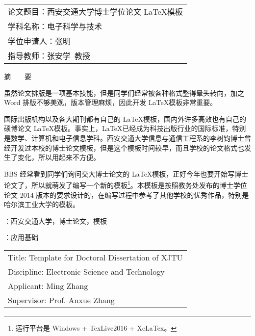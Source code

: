 
\setcounter{page}{1}

\begin{table}[!ht]\xiaosi\hei\vskip-1.5mm
	\begin{tabular}{@{}l}
		论文题目：西安交通大学博士学位论文 \LaTeX 模板 \\
		学科名称：电子科学与技术 \\
		学位申请人：张明 \\
		指导教师：张安学~教授
	\end{tabular}
\end{table}

\noindent\parbox[c][15mm][c]{\textwidth}{\centering\sanhao 摘~~~~要}

虽然论文排版是一项基本技能，但是同学们经常被各种格式整得晕头转向，加之 Word 排版不够美观，版本管理麻烦，因此开发 \LaTeX 模板非常重要。

国际出版机构以及各大期刊都有自己的 \LaTeX 模板，国内外许多高效也有自己的硕博论文 \LaTeX 模板。事实上，\LaTeX 已经成为科技出版行业的国际标准，特别是数学、计算机和电子信息学科。西安交通大学信息与通信工程系的李树钧博士曾经开发过本校的博士论文模板，但是这个模板时间较早，而且学校的论文格式也发生了变化，所以用起来不方便。

BBS 经常看到同学们询问交大博士论文的 \LaTeX 模板，正好今年也要开始写博士论文了，所以就萌发了编写一个新的模板\footnote{运行平台是 \color{red}Windows + TexLive2016 + XeLaTex。}。本模板是按照教务处发布的博士学位论文 2014 版本的要求设计的，在编写过程中参考了其他学校的优秀作品，特别是哈尔滨工业大学的模板。

\vspace{\baselineskip}
{ \hangindent=50.7pt
	：西安交通大学，博士论文，模板
	
	\vspace{\baselineskip}
	：应用基础
}
\clearpage


\begin{table}[!ht]\fontsize{11.5pt}{11.5pt}\selectfont\bfseries\vskip-3mm
	\begin{tabular}{@{}l}
		Title: Template for Doctoral Dissertation of XJTU \\
		Discipline: Electronic Science and Technology \\
		Applicant: Ming Zhang \\
		Supervisor: Prof. Anxue Zhang
	\end{tabular}
\end{table}


